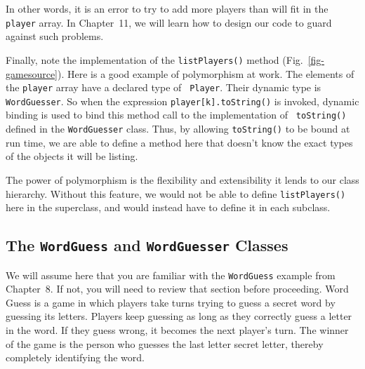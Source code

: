 \noindent In other words, it is an error to try to add more players
than will fit in the {\tt player} array. In Chapter~11, we will learn
how to design our code to guard against such problems. 

Finally, note the implementation of the {\tt listPlayers()} method
(Fig.~\ref{fig-gamesource}).
\noindent Here is a good example of polymorphism at work. The
elements of the {\tt player} array have a declared type of {\tt
Player}. Their dynamic type is {\tt WordGuesser}. So when the
expression {\tt player[k].toString()} is invoked, dynamic binding is
used to bind this method call to the implementation of {\tt
toString()} defined in the {\tt WordGuesser} class.  Thus, by
allowing {\tt toString()} to be bound at run time, we are able
to define a method here that doesn't know the exact types of the
objects it will be listing.

The power of polymorphism is the flexibility and extensibility it
lends to our class hierarchy.  Without this feature, we would not be
able to define {\tt listPlayers()} here in the superclass, and would
instead have to define it in each subclass.  


\subsection{The {\tt WordGuess} and {\tt WordGuesser} Classes}

We will assume here that you are familiar with the {\tt WordGuess}
example from Chapter~8. If not, you will need to review that section
before proceeding.  Word Guess is a game in which players take turns
trying to guess a secret word by guessing its letters. Players keep
guessing as long as they correctly guess a letter in the word. If they
guess wrong, it becomes the next player's turn. The winner of the game
is the person who guesses the last letter secret letter, thereby
completely identifying the word. 

